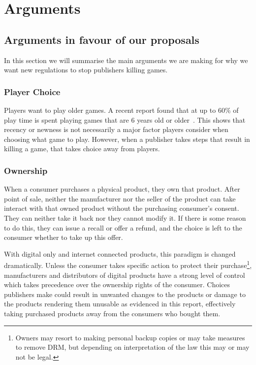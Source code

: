 \chapter{Arguments}

\section{Arguments in favour of our proposals}
In this section we will summarise the main arguments we are making for why we want new regulations to stop publishers killing games.

\subsection{Player Choice}
Players want to play older games.
A recent report found that at up to 60\% of play time is spent playing games that are 6 years old or older~\cite{kotaku-oldgames-2024}.
This shows that recency or newness is not necessarily a major factor players consider when choosing what game to play.
However, when a publisher takes steps that result in killing a game, that takes choice away from players.


\subsection{Ownership}
When a consumer purchases a physical product, they own that product.
After point of sale, neither the manufacturer nor the seller of the product can take interact with that owned product without the purchasing consumer's consent.
They can neither take it back nor they cannot modify it.
If there is some reason to do this, they can issue a recall or offer a refund, and the choice is left to the consumer whether to take up this offer.

With digital only and internet connected products, this paradigm is changed dramatically.
Unless the consumer takes specific action to protect their purchase\footnote{
Owners may resort to making personal backup copies or may take measures to remove DRM,
but depending on interpretation of the law this may or may not be legal.
},
manufacturers and distributors of digital products have a strong level of control which takes precedence over the ownership rights of the consumer.
Choices publishers make could result in unwanted changes to the products or damage to the products rendering them unusable as evidenced in this report,
effectively taking purchased products away from the consumers who bought them.

